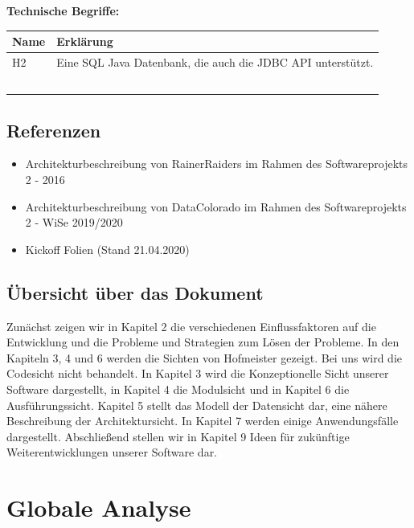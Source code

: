 \documentclass[fontsize=12pt,paper=a4,twoside]{scrartcl}
\begin{document}
\textbf{Technische Begriffe:}
\begin{table}[]
\begin{tabular}{|l|l|}
\hline
Name & Erklärung \\ \hline
H2 & Eine SQL Java Datenbank, die auch die JDBC API unterstützt. \\ \hline
 & \\ \hline
 & \\ \hline
 & \\ \hline
 & \\ \hline
 & \\ \hline
\end{tabular}
\end{table}

\subsection{Referenzen}

\begin{itemize}
\item{Architekturbeschreibung von RainerRaiders im Rahmen des Softwareprojekts 2 - 2016}
\item{Architekturbeschreibung von DataColorado im Rahmen des Softwareprojekts 2 - WiSe 2019/2020}
\item{Kickoff Folien (Stand 21.04.2020)}
\end{itemize}

\subsection{Übersicht über das Dokument}

Zunächst zeigen wir in Kapitel 2 die verschiedenen Einflussfaktoren auf die Entwicklung und die Probleme und Strategien zum Lösen der Probleme. In den Kapiteln 3, 4 und 6 werden die Sichten von Hofmeister gezeigt. Bei uns wird die Codesicht nicht behandelt. In Kapitel 3 wird die Konzeptionelle Sicht unserer Software dargestellt, in Kapitel 4 die Modulsicht und in Kapitel 6 die Ausführungssicht. Kapitel 5 stellt das Modell der Datensicht dar, eine nähere Beschreibung der Architektursicht. In Kapitel 7 werden einige Anwendungsfälle dargestellt. Abschließend stellen wir in Kapitel 9 Ideen für zukünftige Weiterentwicklungen unserer Software dar. 


\section{Globale Analyse} \label{sec:globale_analyse}
\end{document}
